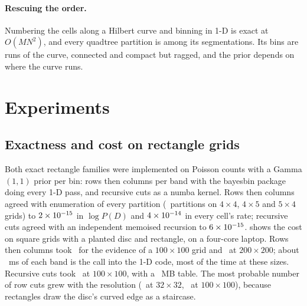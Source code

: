 \documentclass[11pt,a4paper]{article}
\begin{document}
\paragraph{Rescuing the order.} Numbering the cells along a Hilbert curve \citep{hilbert1891stetige}
and binning in 1-D is exact at $O(MN^2)$, and every quadtree partition is among its segmentations.
Its bins are runs of the curve, connected and compact but ragged, and the prior depends on where
the curve runs.

\section{Experiments}\label{sec:experiments}

\subsection{Exactness and cost on rectangle grids}

Both exact rectangle families were implemented on Poisson counts with a Gamma$(1,1)$ prior per bin:
rows then columns per band with the bayesbin package \citep{bayesbin} doing every 1-D pass, and
recursive cuts as a numba kernel. Rows then columns agreed with enumeration of every partition
(\checkPartitions\ partitions on $4 \times 4$, $4 \times 5$ and $5 \times 4$ grids) to
$2\times10^{-15}$ in $\log P(D)$ and $4\times10^{-14}$ in every cell's rate; recursive cuts
agreed with an independent memoised recursion to $6\times10^{-15}$.  shows
the cost on square grids with a planted disc and rectangle, on a four-core laptop. Rows then
columns took \twoLevelEvidenceHundred\ for the evidence of a $100 \times 100$ grid and
\twoLevelEvidenceTwoHundred\ at $200 \times 200$; about \callOverhead~ms of each band is the call
into the 1-D code, most of the time at these sizes. Recursive cuts took \recursiveHundred\ at $100
\times 100$, with a \recursiveMBHundred~MB table. The most probable number of row cuts grew with
the resolution (\twoLevelMThirtyTwo\ at $32 \times 32$, \twoLevelMHundred\ at $100 \times 100$),
because rectangles draw the disc's curved edge as a staircase.
\end{document}
